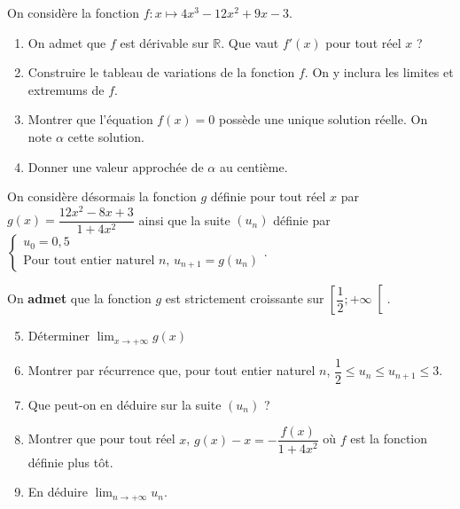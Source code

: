 \documentclass[11pt,fleqn, openany]{book} %
\begin{document}
\begin{exercise}On considère la fonction $f : x \mapsto 4x^3-12x^2+9x-3$.

\begin{enumerate}
\item On admet que $f$ est dérivable sur $\mathbb{R}$. Que vaut $f'(x)$ pour tout réel $x$ ?

\item Construire le tableau de variations de la fonction $f$. On y inclura les limites et extremums de $f$.

\item Montrer que l'équation $f(x)=0$ possède une unique solution réelle. On note $\alpha$ cette solution.

\item Donner une valeur approchée de $\alpha$ au centième.
\end{enumerate}

On considère désormais la fonction $g$ définie pour tout réel $x$ par $g(x)=\dfrac{12x^2-8x+3}{1+4x^2}$ ainsi que la suite $(u_n)$ définie par $\left\{\begin{array}{l} u_0=0,5 \\ \text{Pour tout entier naturel }n,\,u_{n+1}=g(u_n) \end{array}\right.$.

On \textbf{admet} que la fonction $g$ est strictement croissante sur $\left[ \dfrac{1}{2} ; +\infty \right[$.

\begin{enumerate}
\setcounter{enumi}{4}
\item Déterminer $\displaystyle\lim_{x \to + \infty}g(x)$

\item Montrer par récurrence que, pour tout entier naturel $n$, $\dfrac{1}{2} \leqslant u_n \leqslant u_{n+1} \leqslant 3$.

\item Que peut-on en déduire sur la suite $(u_n)$ ?

\item Montrer que pour tout réel $x$, $g(x)-x=-\dfrac{f(x)}{1+4x^2}$ où $f$ est la fonction définie plus tôt.

\item En déduire $\displaystyle \lim _{n \to + \infty}u_n$.
\end{enumerate}\end{exercise}
\end{document}
